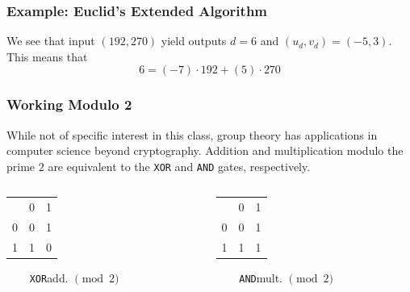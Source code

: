 \documentclass{beamer}
\newcommand{\<}{\langle}
\renewcommand{\>}{\rangle}
\begin{document}
\begin{frame}
\frametitle{Example: Euclid's Extended Algorithm}

We see that input $(192, 270)$ yield outputs $d=6$ and $(u_d, v_d) = (-5, 3)$. This means that
\[
6 = (-7)\cdot 192 + (5) \cdot 270
\]
\end{frame}



\begin{frame}[fragile]
\frametitle{Working Modulo 2}

While not of specific interest in this class, group theory has applications in computer science beyond cryptography. Addition and multiplication modulo the prime $2$ are equivalent to the \verb|XOR| and \verb|AND| gates, respectively. \newline


\begin{columns}
\begin{column}{.3\textwidth}
\begin{tabular}{ r|c|c| }
\multicolumn{1}{r}{}
 &  \multicolumn{1}{c}{0}
 & \multicolumn{1}{c}{1} \\
\cline{2-3}
0 &  0&  1\\
\cline{2-3}
1 & 1&0 \\
\cline{2-3}
\end{tabular}\newline

\verb|    XOR|\newline add. $\pmod 2$
\end{column}

\begin{column}{.3\textwidth}
\begin{tabular}{ r|c|c| }
\multicolumn{1}{r}{}
 &  \multicolumn{1}{c}{0}
 & \multicolumn{1}{c}{1} \\
\cline{2-3}
0 &  0&  1\\
\cline{2-3}
1 &1 & 1\\
\cline{2-3}
\end{tabular}\newline

\verb|    AND|\newline mult. $\pmod 2$
\end{column}
\end{columns}
\end{frame}
\end{document}
